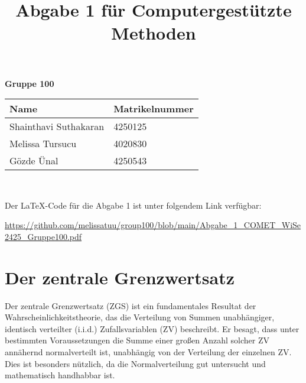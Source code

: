 \documentclass[a4paper, 12pt]{article}
\title{Abgabe 1 für Computergestützte Methoden}
\author{}
\date{}
\begin{document}
\maketitle
\begin{center}  
    \textbf{Gruppe 100} \\[1 cm]
    
    \begin{tabular}{l | l}
        \textbf{Name} & \textbf{Matrikelnummer} \\ \hline
        Shainthavi Suthakaran & 4250125 \\
        Melissa Tursucu & 4020830 \\
        Gözde Ünal & 4250543 \\
    \end{tabular} \\[1cm]
\end{center}

\vspace{\baselineskip}

\maketitle
\tableofcontents

\vspace{\baselineskip}
Der LaTeX-Code für die Abgabe 1 ist unter 
folgendem Link verfügbar:

\maketitle

\url{https://github.com/melissatuu/group100/blob/main/Abgabe_1_COMET_WiSe2425_Gruppe100.pdf}

\newpage


\section{Der zentrale Grenzwertsatz}

Der zentrale Grenzwertsatz (ZGS) ist ein fundamentales Resultat der Wahrscheinlichkeitstheorie, das die Verteilung von Summen unabhängiger, identisch verteilter (i.i.d.) Zufallsvariablen (ZV) beschreibt. Er besagt, dass unter bestimmten Voraussetzungen die Summe einer großen Anzahl solcher ZV annähernd normalverteilt ist, unabhängig von der Verteilung der einzelnen ZV. Dies ist besonders nützlich, da die Normalverteilung gut untersucht und mathematisch handhabbar ist.
\end{document}
